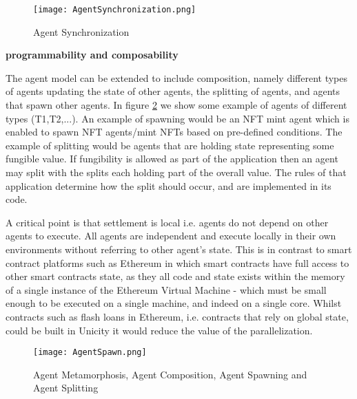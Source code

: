 \documentclass{article}
\begin{document}
\vspace{2mm}

\begin{figure}[H]
    \centering
    \texttt{[image: AgentSynchronization.png]}
    \caption{Agent Synchronization}
    \label{fig:AgentSynch}
\end{figure}

\vspace{2mm}

\textbf{programmability and composability}

\vspace{2mm}

The agent model can be extended to include composition, namely different types of agents updating the state of other agents, the splitting of agents, and agents that spawn other agents. In figure \ref{fig:AgentSpawn} we show some example of agents of different types (T1,T2,...). An example of spawning would be an NFT mint agent which is enabled to spawn NFT agents/mint NFTs based on pre-defined conditions. The example of splitting would be agents that are holding state representing some fungible value. If fungibility is allowed as part of the application then an agent may split with the splits each holding part of the overall value. The rules of that application determine how the split should occur, and are implemented in its code. 

\vspace{2mm}

A critical point is that settlement is local i.e. agents do not depend on other agents to execute. All agents are independent and execute locally in their own environments without referring  to other agent's state. This is in contrast to smart contract platforms such as Ethereum in which smart contracts have full access to other smart contracts state, as they all code and state exists within the memory of a single instance of the Ethereum Virtual Machine - which must be small enough to be executed on a single machine, and indeed on a single core. Whilst contracts such as flash loans in Ethereum, i.e. contracts that rely on global state, could be built in Unicity it would reduce the value of the parallelization.


\begin{figure}[H]
    \centering
    \texttt{[image: AgentSpawn.png]}
    \caption{Agent Metamorphosis, Agent Composition, Agent Spawning and Agent Splitting}
    \label{fig:AgentSpawn}
\end{figure}
\end{document}
